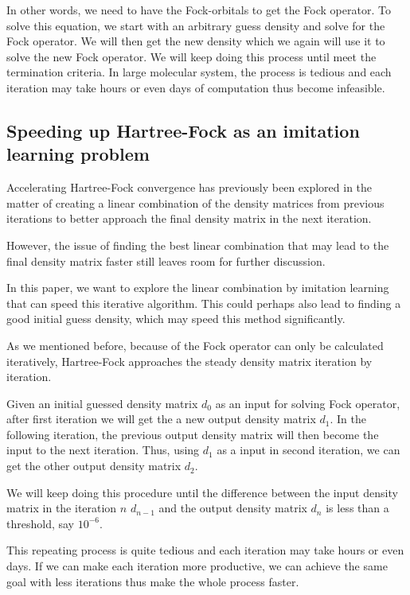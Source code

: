 \documentclass[twoside]{article}
\begin{document}
In other words, we need to have the Fock-orbitals to get the Fock operator. To solve this equation, we start with an arbitrary guess density and solve for the Fock operator. We will then get the new density which we again will use it to solve the new Fock operator. We will keep doing this process until meet the termination criteria. In large molecular system, the process is tedious and each iteration may take hours or even days of computation thus become infeasible.

\subsection{Speeding up Hartree-Fock as an imitation learning problem}


Accelerating Hartree-Fock convergence has previously been explored in the matter of creating a linear combination of the density matrices from previous iterations to better approach the final density matrix in the next iteration.\cite{Pulay1980} 

However, the issue of finding the best linear combination that may lead to the final density matrix faster still leaves room for further discussion.

In this paper,
we want to explore the linear combination by imitation learning that can speed this iterative algorithm. This could perhaps also lead to finding a good initial guess density, which may speed this method significantly. 


As we mentioned before,  because of the Fock operator can only be calculated iteratively, Hartree-Fock approaches the steady density matrix iteration by iteration.

Given an initial guessed density matrix $d_0$ as an input for solving Fock operator, after first iteration we will get the a new output density matrix $d_1$. In the following iteration, the previous output density matrix will then become the input to the next iteration. Thus, using $d_1$ as a input in second iteration, we can get the other output density matrix $d_2$. 

We will keep doing this procedure until the difference between the input density matrix in the iteration $n$ $d_{n-1}$  and the output density matrix $d_n$ is less than a threshold, say $10^{-6}$. 

This repeating process is quite tedious and each iteration may take hours or even days. If we can make each iteration more productive, we can achieve the same goal with less iterations thus make the whole process faster.
\end{document}
